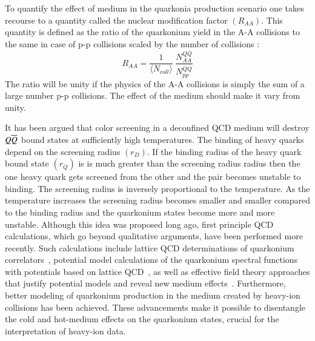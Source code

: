  To quantify the effect of medium in the quarkonia production scenario one takes recourse to a 
 quantity called the nuclear modification factor $(R_{AA})$. This quantity is defined as the ratio 
 of the quarkonium yield in the A-A collisions to the same in case of p-p collisions scaled by the 
 number of collisions : 
 \begin{equation}
 R_{AA} = \frac{1}{\langle N_{coll} \rangle} \ \frac {N^{Q{\bar Q}}_{AA}} {N^{Q{\bar Q}}_{pp}} 
 \end{equation}
 The ratio will be unity if the physics of the A-A collisions is simply the sum of a large number 
 p-p collisions. The effect of the medium should make it vary from unity. 



It has been argued that color screening 
in a deconfined QCD medium will destroy $Q \overline{Q}$ bound states
at sufficiently high temperatures. The binding of heavy quarks depend on the 
screening radius $(r_D)$. If the binding radius of the heavy quark bound state 
$(r_Q)$ is is much greater than the screening radius radius then the one heavy 
quark gets screened from the other and the pair becomes unstable to binding. 
The screening radius is inversely proportional to the temperature. As the temperature 
increases the screening radius becomes smaller and smaller compared to the 
binding radius and the quarkonium states become more and more unstable. 
Although 
this idea was proposed long ago, first principle QCD calculations, 
which go beyond qualitative arguments, have been performed more recently. 
Such calculations include lattice QCD determinations of quarkonium 
correlators~\cite{Umeda:2002vr,Asakawa:2003re,Datta:2003ww,Jakovac:2006sf,Aarts:2007pk},
potential model calculations 
of the quarkonium spectral functions with potentials based on lattice 
QCD~\cite{Digal:2001ue,Wong:2004zr,Mocsy:2005qw,Mocsy:2004bv,Alberico:2006vw,Cabrera:2006wh,Mocsy:2007yj,Mocsy:2007jz},
as well as effective 
field theory approaches that justify potential models and reveal new medium 
effects~\cite{Laine:2007qy,Laine:2007gj,Laine:2008cf,Brambilla:2008cx}.  
Furthermore, better modeling of 
quarkonium production in the medium created by heavy-ion collisions has 
been achieved.   These advancements make it possible to disentangle the cold
and hot-medium effects on the quarkonium states, crucial for the 
interpretation of heavy-ion data. 



